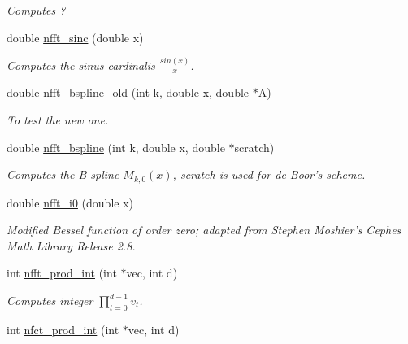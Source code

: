 \begin{CompactItemize}
\begin{CompactList}\small\item\em Computes ? \item\end{CompactList}\item 
\hypertarget{group__nfftutil_ga6}{
double \hyperlink{group__nfftutil_ga6}{nfft\_\-sinc} (double x)}
\label{group__nfftutil_ga6}

\begin{CompactList}\small\item\em Computes the sinus cardinalis $\frac{sin\left(x\right)}{x}$. \item\end{CompactList}\item 
\hypertarget{group__nfftutil_ga7}{
double \hyperlink{group__nfftutil_ga7}{nfft\_\-bspline\_\-old} (int k, double x, double $\ast$A)}
\label{group__nfftutil_ga7}

\begin{CompactList}\small\item\em To test the new one. \item\end{CompactList}\item 
\hypertarget{group__nfftutil_ga8}{
double \hyperlink{group__nfftutil_ga8}{nfft\_\-bspline} (int k, double x, double $\ast$scratch)}
\label{group__nfftutil_ga8}

\begin{CompactList}\small\item\em Computes the B-spline $M_{k,0}\left(x\right)$, scratch is used for de Boor's scheme. \item\end{CompactList}\item 
double \hyperlink{group__nfftutil_ga9}{nfft\_\-i0} (double x)
\begin{CompactList}\small\item\em Modified Bessel function of order zero; adapted from Stephen Moshier's Cephes Math Library Release 2.8. \item\end{CompactList}\item 
\hypertarget{group__nfftutil_ga10}{
int \hyperlink{group__nfftutil_ga10}{nfft\_\-prod\_\-int} (int $\ast$vec, int d)}
\label{group__nfftutil_ga10}

\begin{CompactList}\small\item\em Computes integer $\prod_{t=0}^{d-1} v_t$. \item\end{CompactList}\item 
\hypertarget{group__nfftutil_ga11}{
int \hyperlink{group__nfftutil_ga11}{nfct\_\-prod\_\-int} (int $\ast$vec, int d)}
\label{group__nfftutil_ga11}


\end{CompactItemize}

